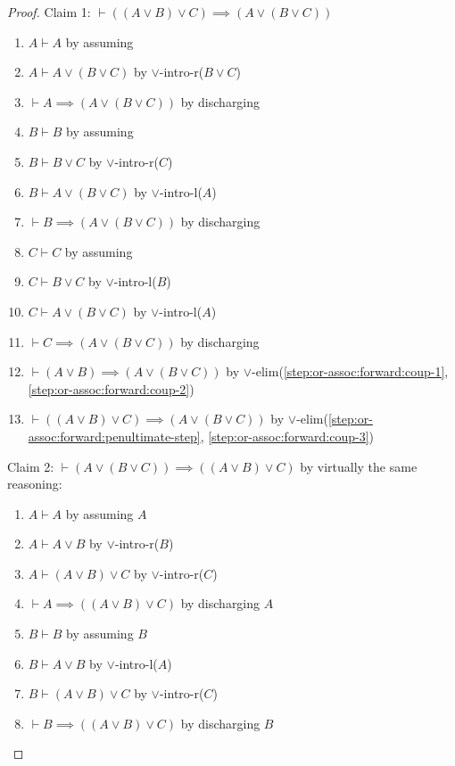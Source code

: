 \begin{proof}
Claim 1: $\vdash((A\lor B)\lor C)\implies(A\lor(B\lor C))$
\begin{enumerate}
\item $A\vdash A$ by assuming
\item $A\vdash A\lor(B\lor C)$ by $\lor$-intro-r($B\lor C$)
\item\label{step:or-assoc:forward:coup-1} $\vdash A\implies(A\lor(B\lor C))$ by discharging
\item $B\vdash B$ by assuming
\item $B\vdash B\lor C$ by $\lor$-intro-r($C$)
\item $B\vdash A\lor(B\lor C)$ by $\lor$-intro-l($A$)
\item\label{step:or-assoc:forward:coup-2} $\vdash B\implies(A\lor(B\lor C))$ by discharging
\item $C\vdash C$ by assuming
\item $C\vdash B\lor C$ by $\lor$-intro-l($B$)
\item $C\vdash A\lor(B\lor C)$ by $\lor$-intro-l($A$)
\item\label{step:or-assoc:forward:coup-3} $\vdash C\implies(A\lor(B\lor C))$ by discharging
\item\label{step:or-assoc:forward:penultimate-step} $\vdash(A\lor B)\implies(A\lor(B\lor C))$ by $\lor$-elim(\ref{step:or-assoc:forward:coup-1}, \ref{step:or-assoc:forward:coup-2})
\item $\vdash((A\lor B)\lor C)\implies(A\lor(B\lor C))$ by $\lor$-elim(\ref{step:or-assoc:forward:penultimate-step}, \ref{step:or-assoc:forward:coup-3})
\end{enumerate}
Claim 2: $\vdash(A\lor(B\lor C))\implies((A\lor B)\lor C)$ by
virtually the same reasoning:
\begin{enumerate}
\item $A\vdash A$ by assuming $A$
\item $A\vdash A\lor B$ by $\lor$-intro-r($B$)
\item $A\vdash (A\lor B)\lor C$ by $\lor$-intro-r($C$)
\item\label{step:or-assoc:backward:coup-1} $\vdash A\implies((A\lor B)\lor C)$ by discharging $A$
\item $B\vdash B$ by assuming $B$
\item $B\vdash A\lor B$ by $\lor$-intro-l($A$)
\item $B\vdash(A\lor B)\lor C$ by $\lor$-intro-r($C$)
\item\label{step:or-assoc:backward:coup-2} $\vdash B\implies((A\lor B)\lor C)$ by discharging $B$

\end{enumerate}
\end{proof}
